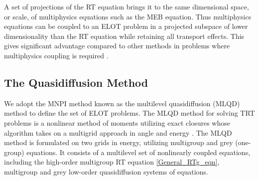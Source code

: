	\ind A set of projections of the RT equation brings it to the same dimensional space, or scale, of multiphysics equations such as the MEB equation. Thus multiphysics equations can be coupled to an ELOT problem in a projected subspace of lower dimensionality than the RT equation while retaining all transport effects. This gives significant advantage compared to other methods in problems where multiphysics coupling is required \cite{adams-larsen-2002}.
	
\subsection{The Quasidiffusion Method} \label{sec:qd_roms}
	We adopt the MNPI method known as the multilevel quasidiffusion (MLQD) method to define the set of ELOT problems. The MLQD method for solving TRT problems is a nonlinear method of moments utilizing exact closures whose algorithm takes on a multigrid approach in angle and energy \cite{gol'din-1964,Goldin-sbornik-82,PASE-1986,dya-aristova-vya-mm1996,aristova-vya-avk-m&c1999,adams-larsen-2002}. The MLQD method is formulated on two grids in energy, utilizing multigroup and grey (one-group) equations. It consists of a multilevel set of nonlinearly coupled equations, including the high-order multigroup RT equation \eqref{General_RTg_eqn}, multigroup and grey low-order quasidiffusion systems of equations.
	
